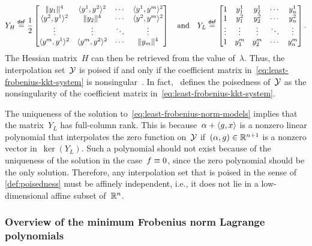 \begin{equation*}
    Y_H \mathrel{\stackrel{\mathsf{def}}{=}} \frac{1}{2}
    \begin{bmatrix}
        \lVert y_1\rVert^4        & \langle y^1, y^2\rangle^2    & \cdots    & \langle y^1, y^m\rangle^2\\
        \langle y^2, y^1\rangle^2  &  \lVert y_2\rVert^4         & \cdots    & \langle y^2, y^m\rangle^2\\
        \vdots              & \vdots                & \ddots    & \vdots\\
        \langle y^m, y^1\rangle^2  & \langle y^m, y^2\rangle^2    & \cdots    & \lVert y_m\rVert^4\\
    \end{bmatrix}
    \quad \text{and} \quad Y_L \mathrel{\stackrel{\mathsf{def}}{=}} 
    \begin{bmatrix}
        1       & y_1^1     & y_2^1     & \cdots    & y_n^1\\
        1       & y_1^2     & y_2^2     & \cdots    & y_n^2\\
        \vdots  & \vdots    & \vdots    & \ddots    & \vdots\\
        1       & y_1^m     & y_2^m     & \cdots    & y_n^m\\
    \end{bmatrix}.
\end{equation*}
The Hessian matrix~$H$ can then be retrieved from the value of~$\lambda$.
Thus, the interpolation set~$\xpt$ is poised if and only if the coefficient matrix in~\cref{eq:least-frobenius-kkt-system} is nonsingular~\cite[\S~5.3]{Conn_Scheinberg_Vicente_2009b}.
In fact,~\cite{Conn_Scheinberg_Vicente_2009b} defines the poisedness of~$\xpt$ as the nonsingularity of the coefficient matrix in~\cref{eq:least-frobenius-kkt-system}.

The uniqueness of the solution to~\cref{eq:least-frobenius-norm-models} implies that the matrix~$Y_L$ has full-column rank.
This is because~$\alpha + \langle g, x\rangle$ is a nonzero linear polynomial that interpolates the zero function on~$\xpt$ if~$(\alpha, g) \in \mathbb{R}^{n + 1}$ is a nonzero vector in~$\ker(Y_L)$.
Such a polynomial should not exist because of the uniqueness of the solution in the case~$f \equiv 0$, since the zero polynomial should be the only solution.
Therefore, any interpolation set that is poised in the sense of \cref{def:poisedness} must be affinely independent, i.e., it does not lie in a low-dimensional affine subset of~$\mathbb{R}^n$.

\subsubsection{Overview of the minimum Frobenius norm Lagrange polynomials}

